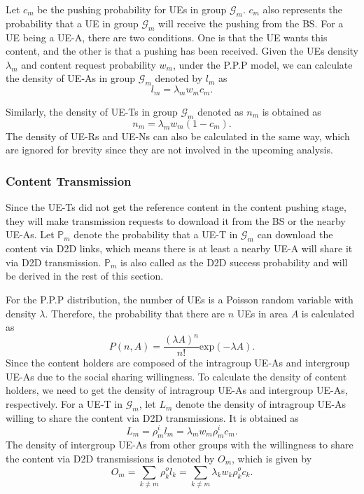 \documentclass[12pt, draftclsnofoot, onecolumn]{IEEEtran}
\begin{document}
Let $c_m$ be the pushing probability for UEs in group $\mathcal{G}_m$. $c_m$ also represents the probability that a UE in group $\mathcal{G}_m$ will receive the pushing from the BS. For a UE being a UE-A, there are two conditions. One is that the UE wants this content, and the other is that a pushing has been received. Given the UEs density $\lambda_m$ and content  request probability $w_m$, under the P.P.P model, we can calculate the density of UE-As in group $\mathcal{G}_m$ denoted by $l_m$ as
\begin{equation}
l_m = \lambda_m w_m c_m.
\end{equation}

Similarly, the density of UE-Ts in group $\mathcal{G}_m$ denoted as $n_{m}$ is obtained as
\begin{equation} \label{nm}
n_{m} = \lambda_m w_m (1-c_m).
\end{equation}
The density of UE-Rs and UE-Ns can also be calculated in the same way, which are ignored for brevity since they are not involved in the upcoming analysis.

\subsubsection{Content Transmission}

Since the UE-Ts did not get the reference content in the content pushing stage, they will make transmission requests to download it from the BS or the nearby UE-As. Let $\mathbb{P}_m$ denote the probability that a UE-T in $\mathcal{G}_m$ can download the content via D2D links, which means there is at least a nearby UE-A will share it via D2D transmission. $\mathbb{P}_m$ is also called as the D2D success probability and will be derived in the rest of this section.

For the P.P.P distribution, the number of UEs is a Poisson random variable with density $\lambda$. Therefore, the probability that there are $n$ UEs in area $A$ is calculated as
\begin{equation}\label{po}
P(n,A)= \frac{(\lambda A)^n}{n!}\textrm{exp}(-\lambda A).
\end{equation}
Since the content holders are composed of the intragroup UE-As and intergroup UE-As due to the social sharing willingness. To calculate the density of content holders, we need to get the density of intragroup UE-As and intergroup UE-As, respectively.
For a UE-T in $\mathcal{G}_m$, let $L_m$ denote the density of intragroup UE-As willing to share the content via D2D transmissions. It is obtained as
\begin{equation}
L_m=\rho_m^i l_m=\lambda_m w_m \rho_m^i c_m.
\end{equation}
The density of intergroup UE-As from other groups with the willingness to share the content via D2D transmissions is denoted by $O_{m}$, which is given by
\begin{equation}\label{om}
 O_{m}=\sum_{k \neq m}\rho_k^o l_k= \sum_{k \neq m}\lambda_k w_k  \rho_k^o c_k.
\end{equation}
\end{document}
